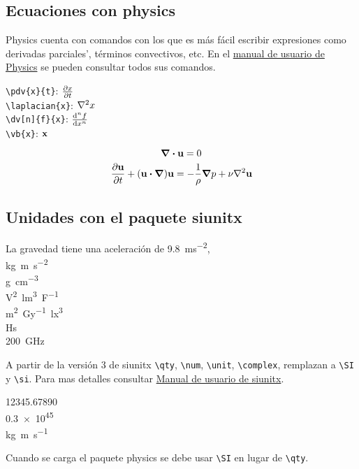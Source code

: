\subsection{Ecuaciones con physics}

Physics cuenta con comandos con los que es más fácil escribir expresiones como derivadas parciales', términos convectivos, etc. En el \href{http://mirrors.ibiblio.org/CTAN/macros/latex/contrib/physics/physics.pdf}{manual de usuario de Physics} se pueden consultar todos sus comandos.

\verb'\pdv{x}{t}': $\pdv{x}{t}$\\
\verb'\laplacian{x}': $\laplacian{x}$\\
\verb'\dv[n]{f}{x}': $\dv[n]{f}{x}$\\
\verb'\vb{x}': $\vb{x}$

\begin{equation}
    \div{\vb{u}}=0
\end{equation}
\begin{equation}
    \pdv{\vb{u}}{t}+\pqty{\vb{u}\vdot\grad}\vb{u}=-\frac{1}{\rho}\grad{p}+\nu\laplacian{\vb{u}}
\end{equation}

\subsection{Unidades con el paquete siunitx}

La gravedad tiene una aceleración de \SI{9.8}{ms^{-2}},\\
\si{\kilo\gram\metre\per\square\second} \\
\si{\gram\per\cubic\centi\metre}\\        \si{\square\volt\cubic\lumen\per\farad}\\
\si{\metre\squared\per\gray\cubic\lux} \\ 
\si{Hs}\\
\SI{200}{GHz}

A partir de la versión 3 de siunitx \verb!\qty!, \verb!\num!, \verb!\unit!, \verb!\complex!, remplazan a \verb!\SI! y \verb!\si!. Para mas detalles consultar \href{https://ctan.mirrors.hoobly.com/macros/latex/contrib/siunitx/siunitx.pdf}{Manual de usuario de siunitx}.

\num{12345,67890} \\
\num{.3e45} \\ 
\unit{kg.m.s^{-1}}

Cuando se carga el paquete physics se debe usar \verb!\SI! en lugar de \verb!\qty!.

